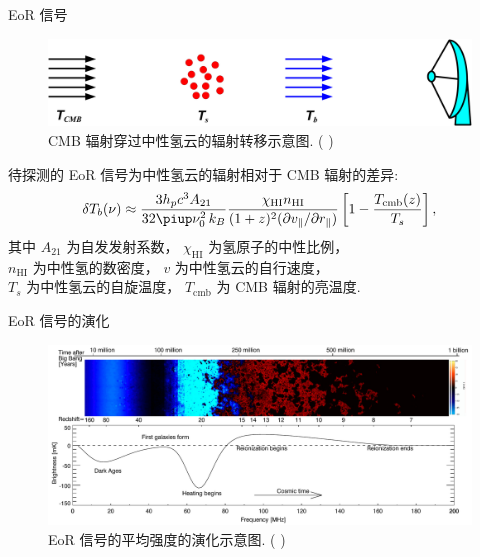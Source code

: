 \documentclass{beamer}
\newcommand{\R}[1]{\text{#1}}  %
\newcommand{\Cpi}{\piup}  %
\newcommand{\citeay}[1]{\citeauthor{#1} \citeyear{#1} \parencite{#1}}
\begin{document}
\begin{frame}{EoR 信号}
  \begin{figure}
    \centering
    \includegraphics[width=\textwidth]{21cm-radiative-transfer}
    \caption{CMB 辐射穿过中性氢云的辐射转移示意图. (\citeay{zaroubi2013})}
  \end{figure}

  待探测的 \alert{EoR 信号}为中性氢云的辐射相对于 CMB 辐射的\alert{差异}:
  \begin{equation}
    \delta T_b(\nu) \approx
      \frac{3 h_p c^3 A_{21}}{32\Cpi \nu_0^2 \,k_B}
      \frac{\chi_{\R{HI}} n_{\R{HI}}}{
        (1+z)^2 (\partial v_{\parallel} / \partial r_{\parallel})}
      \left[ 1 - \frac{T_{\R{cmb}}(z)}{T_s} \right] ,
  \end{equation}
  其中 $A_{21}$ 为自发发射系数，
  $\chi_{\R{HI}}$ 为氢原子的中性比例， \\
  $n_{\R{HI}}$ 为中性氢的数密度，
  $v$ 为中性氢云的自行速度， \\
  $T_s$ 为中性氢云的自旋温度，
  $T_{\R{cmb}}$ 为 CMB 辐射的亮温度.
\end{frame}

\begin{frame}{EoR 信号的演化}
  \begin{figure}
    \centering
    \includegraphics[width=\textwidth]{eor-signal-evolution}
    \caption{EoR 信号的平均强度的演化示意图. (\citeay{pritchard2012})}
  \end{figure}
\end{frame}
\end{document}
